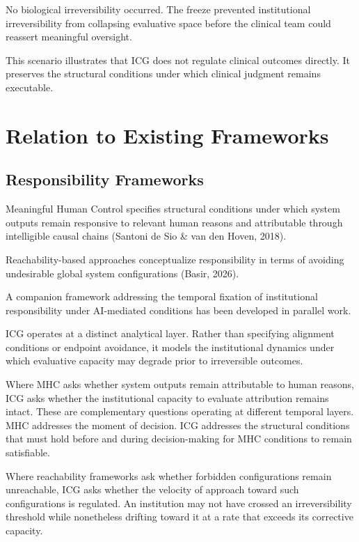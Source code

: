 \documentclass[12pt]{article}
\begin{document}
No biological irreversibility occurred. The freeze prevented institutional irreversibility
from collapsing evaluative space before the clinical team could reassert meaningful oversight.

This scenario illustrates that ICG does not regulate clinical outcomes directly. It preserves
the structural conditions under which clinical judgment remains executable.

\section{Relation to Existing Frameworks}

\subsection{Responsibility Frameworks}

Meaningful Human Control specifies structural conditions under which system outputs remain
responsive to relevant human reasons and attributable through intelligible causal chains
(Santoni de Sio \& van den Hoven, 2018).

Reachability-based approaches conceptualize responsibility in terms of avoiding undesirable
global system configurations (Basir, 2026).

A companion framework addressing the temporal fixation of institutional responsibility
under AI-mediated conditions has been developed in parallel work.

ICG operates at a distinct analytical layer. Rather than specifying alignment conditions
or endpoint avoidance, it models the institutional dynamics under which evaluative capacity
may degrade prior to irreversible outcomes.

Where MHC asks whether system outputs remain attributable to human reasons, ICG asks
whether the institutional capacity to evaluate attribution remains intact. These are
complementary questions operating at different temporal layers. MHC addresses the moment
of decision. ICG addresses the structural conditions that must hold before and during
decision-making for MHC conditions to remain satisfiable.

Where reachability frameworks ask whether forbidden configurations remain unreachable,
ICG asks whether the velocity of approach toward such configurations is regulated. An
institution may not have crossed an irreversibility threshold while nonetheless drifting
toward it at a rate that exceeds its corrective capacity.
\end{document}
